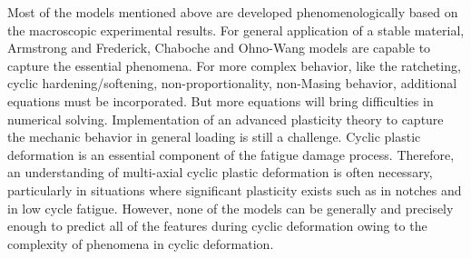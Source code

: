 

Most of the models mentioned above are developed phenomenologically based on the macroscopic experimental results.
For general application of a stable material, Armstrong and Frederick, Chaboche and Ohno-Wang models are capable to capture the essential phenomena.
For more complex behavior, like the ratcheting, cyclic hardening/softening, non-proportionality, non-Masing behavior, additional equations must be incorporated.
But more equations will bring difficulties in numerical solving.
Implementation of an advanced plasticity theory to capture the mechanic behavior in general loading is still a challenge.
Cyclic plastic deformation is an essential component of the fatigue damage process.
Therefore, an understanding of multi-axial cyclic plastic deformation is often necessary, particularly in situations where significant plasticity exists such as in notches and in low cycle fatigue.
However, none of the models can be generally and precisely enough to predict all of the features during cyclic deformation owing to the complexity of phenomena in cyclic deformation.

